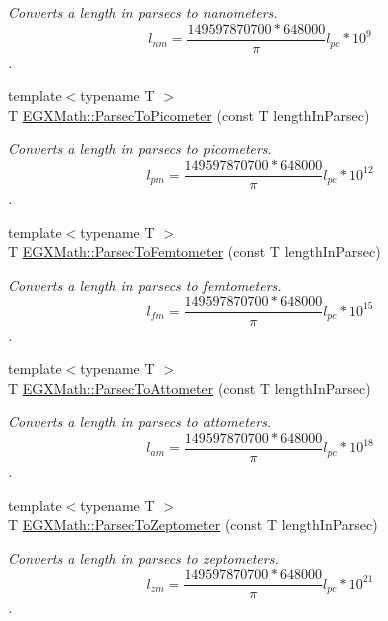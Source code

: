 \begin{DoxyCompactItemize}
\begin{DoxyCompactList}\small\item\em Converts a length in parsecs to nanometers. \[ l_{nm}=\frac{149597870700 * 648000}{\pi}l_{pc} * 10^{9} \]. \end{DoxyCompactList}\item 
{\footnotesize template$<$typename T $>$ }\\T \mbox{\hyperlink{group___e_g_x_math-_conversions-_length_conversions-_astronomical-_parsec-_s_i_ga2d56b414320940d42a8956239e54c8b0}{E\+G\+X\+Math\+::\+Parsec\+To\+Picometer}} (const T length\+In\+Parsec)
\begin{DoxyCompactList}\small\item\em Converts a length in parsecs to picometers. \[ l_{pm}=\frac{149597870700 * 648000}{\pi}l_{pc} * 10^{12} \]. \end{DoxyCompactList}\item 
{\footnotesize template$<$typename T $>$ }\\T \mbox{\hyperlink{group___e_g_x_math-_conversions-_length_conversions-_astronomical-_parsec-_s_i_ga6b6fd844f1af67b873c629f579a8b9ec}{E\+G\+X\+Math\+::\+Parsec\+To\+Femtometer}} (const T length\+In\+Parsec)
\begin{DoxyCompactList}\small\item\em Converts a length in parsecs to femtometers. \[ l_{fm}=\frac{149597870700 * 648000}{\pi}l_{pc} * 10^{15} \]. \end{DoxyCompactList}\item 
{\footnotesize template$<$typename T $>$ }\\T \mbox{\hyperlink{group___e_g_x_math-_conversions-_length_conversions-_astronomical-_parsec-_s_i_ga235c67c3c7b55d4ec553df3e1f435fbd}{E\+G\+X\+Math\+::\+Parsec\+To\+Attometer}} (const T length\+In\+Parsec)
\begin{DoxyCompactList}\small\item\em Converts a length in parsecs to attometers. \[ l_{am}=\frac{149597870700 * 648000}{\pi}l_{pc} * 10^{18} \]. \end{DoxyCompactList}\item 
{\footnotesize template$<$typename T $>$ }\\T \mbox{\hyperlink{group___e_g_x_math-_conversions-_length_conversions-_astronomical-_parsec-_s_i_ga3334cc4dbcddb1ae43e821f518bb56cb}{E\+G\+X\+Math\+::\+Parsec\+To\+Zeptometer}} (const T length\+In\+Parsec)
\begin{DoxyCompactList}\small\item\em Converts a length in parsecs to zeptometers. \[ l_{zm}=\frac{149597870700 * 648000}{\pi}l_{pc} * 10^{21} \]. \end{DoxyCompactList}\item 

\end{DoxyCompactItemize}
